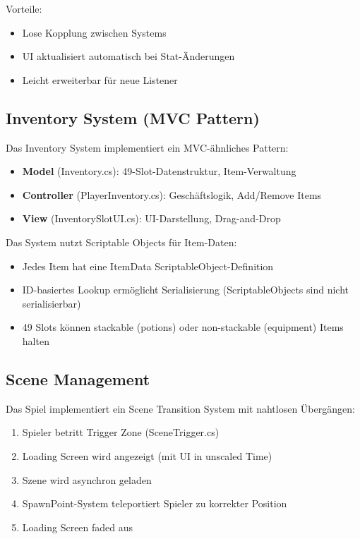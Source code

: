 \documentclass[
  a4paper,
  11pt,
  ngerman,
  parskip=half,
  bibliography=totoc,
  listof=totoc
]{scrreprt}
\begin{document}
Vorteile:
\begin{itemize}
    \item Lose Kopplung zwischen Systems
    \item UI aktualisiert automatisch bei Stat-Änderungen
    \item Leicht erweiterbar für neue Listener
\end{itemize}

\subsection{Inventory System (MVC Pattern)}

Das Inventory System implementiert ein MVC-ähnliches Pattern:

\begin{itemize}
    \item \textbf{Model} (Inventory.cs): 49-Slot-Datenstruktur, Item-Verwaltung
    \item \textbf{Controller} (PlayerInventory.cs): Geschäftslogik, Add/Remove Items
    \item \textbf{View} (InventorySlotUI.cs): UI-Darstellung, Drag-and-Drop
\end{itemize}

Das System nutzt Scriptable Objects für Item-Daten:

\begin{itemize}
    \item Jedes Item hat eine ItemData ScriptableObject-Definition
    \item ID-basiertes Lookup ermöglicht Serialisierung (ScriptableObjects sind nicht serialisierbar)
    \item 49 Slots können stackable (potions) oder non-stackable (equipment) Items halten
\end{itemize}

\subsection{Scene Management}

Das Spiel implementiert ein Scene Transition System mit nahtlosen Übergängen:

\begin{enumerate}
    \item Spieler betritt Trigger Zone (SceneTrigger.cs)
    \item Loading Screen wird angezeigt (mit UI in unscaled Time)
    \item Szene wird asynchron geladen
    \item SpawnPoint-System teleportiert Spieler zu korrekter Position
    \item Loading Screen faded aus
\end{enumerate}
\end{document}
